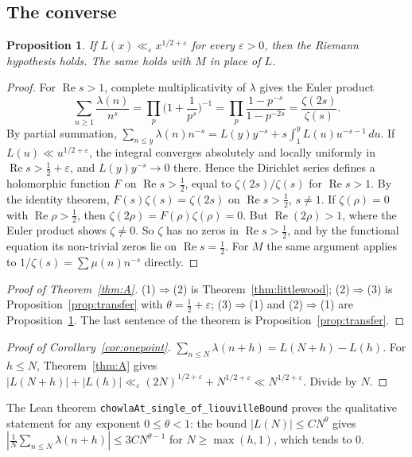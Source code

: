 \documentclass[11pt]{amsart}
\numberwithin{equation}{section}
\theoremstyle{plain}
\newtheorem{prop}[thm]{Proposition}
\theoremstyle{definition}
\theoremstyle{remark}
\renewcommand{\Re}{\operatorname{Re}}
\newcommand{\lean}[1]{\texttt{#1}}
\begin{document}
\subsection{The converse}

\begin{prop}\label{prop:converse}
If $L(x)\ll_\varepsilon x^{1/2+\varepsilon}$ for every $\varepsilon>0$, then the Riemann hypothesis holds. The same holds with $M$ in place of $L$.
\end{prop}

\begin{proof}
For $\Re s>1$, complete multiplicativity of $\lambda$ gives the Euler product
\[
\sum_{n\ge1}\frac{\lambda(n)}{n^s}=\prod_p\Big(1+\frac1{p^s}\Big)^{-1}=\prod_p\frac{1-p^{-s}}{1-p^{-2s}}=\frac{\zeta(2s)}{\zeta(s)}.
\]
By partial summation, $\sum_{n\le y}\lambda(n)n^{-s}=L(y)y^{-s}+s\int_1^yL(u)u^{-s-1}\,du$. If $L(u)\ll u^{1/2+\varepsilon}$, the integral converges absolutely and locally uniformly in $\Re s>\frac12+\varepsilon$, and $L(y)y^{-s}\to0$ there. Hence the Dirichlet series defines a holomorphic function $F$ on $\Re s>\frac12$, equal to $\zeta(2s)/\zeta(s)$ for $\Re s>1$. By the identity theorem, $F(s)\zeta(s)=\zeta(2s)$ on $\Re s>\frac12$, $s\ne1$. If $\zeta(\rho)=0$ with $\Re\rho>\frac12$, then $\zeta(2\rho)=F(\rho)\zeta(\rho)=0$. But $\Re(2\rho)>1$, where the Euler product shows $\zeta\ne0$. So $\zeta$ has no zeros in $\Re s>\frac12$, and by the functional equation its non-trivial zeros lie on $\Re s=\frac12$. For $M$ the same argument applies to $1/\zeta(s)=\sum\mu(n)n^{-s}$ directly.
\end{proof}

\begin{proof}[Proof of Theorem~\ref{thm:A}]
(1)$\Rightarrow$(2) is Theorem~\ref{thm:littlewood}; (2)$\Rightarrow$(3) is Proposition~\ref{prop:transfer} with $\theta=\frac12+\varepsilon$; (3)$\Rightarrow$(1) and (2)$\Rightarrow$(1) are Proposition~\ref{prop:converse}. The last sentence of the theorem is Proposition~\ref{prop:transfer}.
\end{proof}

\begin{proof}[Proof of Corollary~\ref{cor:onepoint}]
$\sum_{n\le N}\lambda(n+h)=L(N+h)-L(h)$. For $h\le N$, Theorem~\ref{thm:A} gives $|L(N+h)|+|L(h)|\ll_\varepsilon(2N)^{1/2+\varepsilon}+N^{1/2+\varepsilon}\ll N^{1/2+\varepsilon}$. Divide by $N$.
\end{proof}

The Lean theorem \lean{chowlaAt\_single\_of\_liouvilleBound} proves the qualitative statement for any exponent $0\le\theta<1$: the bound $|L(N)|\le CN^\theta$ gives $|\frac1N\sum_{n\le N}\lambda(n+h)|\le 3CN^{\theta-1}$ for $N\ge\max(h,1)$, which tends to $0$.
\end{document}

